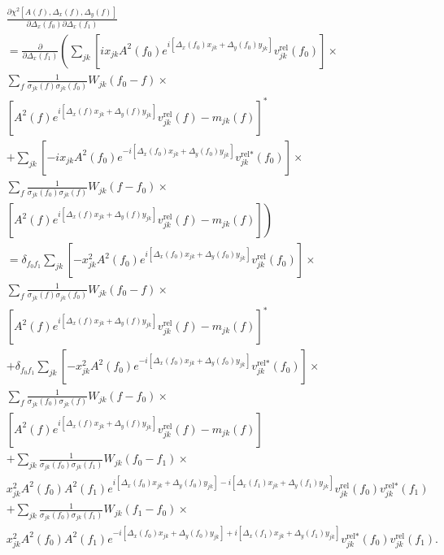 \documentclass{article}
\begin{document}
\begin{equation}
\begin{split}
    &\frac{\partial \chi^2[A(f), \Delta_x(f), \Delta_y(f)]}{\partial \Delta_x(f_0) \partial \Delta_x(f_1)} \\
    & = \frac{\partial}{\partial \Delta_x(f_1)} \left( \sum_{jk} \left[ i x_{jk} A^2(f_0) e^{i[\Delta_x(f_0) x_{jk} + \Delta_y(f_0) y_{jk}]} v^\text{rel}_{jk}(f_0) \right] \times \right. \\
     &\sum_{f}  \frac{1}{\sigma_{jk}(f)\sigma_{jk}(f_0)} W_{jk}(f_0-f) \times \\
    & \left[ A^2(f) e^{i[\Delta_x(f) x_{jk} + \Delta_y(f) y_{jk}]} v^\text{rel}_{jk}(f) - m_{jk}(f) \right]^* \\
    & + \sum_{jk} \left[ -i x_{jk} A^2(f_0) e^{-i[\Delta_x(f_0) x_{jk} + \Delta_y(f_0) y_{jk}]} v^{\text{rel}*}_{jk}(f_0) \right] \times \\
    & \sum_{f}  \frac{1}{\sigma_{jk}(f_0)\sigma_{jk}(f)} W_{jk}(f-f_0) \times \\
    & \left. \left[ A^2(f) e^{i[\Delta_x(f) x_{jk} + \Delta_y(f) y_{jk}]} v^\text{rel}_{jk}(f) - m_{jk}(f) \right] \right) \\
    & = \delta_{f_0 f_1} \sum_{jk} \left[ - x^2_{jk} A^2(f_0) e^{i[\Delta_x(f_0) x_{jk} + \Delta_y(f_0) y_{jk}]} v^\text{rel}_{jk}(f_0) \right] \times \\
     &\sum_{f}  \frac{1}{\sigma_{jk}(f)\sigma_{jk}(f_0)} W_{jk}(f_0-f) \times \\
    & \left[ A^2(f) e^{i[\Delta_x(f) x_{jk} + \Delta_y(f) y_{jk}]} v^\text{rel}_{jk}(f) - m_{jk}(f) \right]^* \\
    & + \delta_{f_0 f_1} \sum_{jk} \left[ - x^2_{jk} A^2(f_0) e^{-i[\Delta_x(f_0) x_{jk} + \Delta_y(f_0) y_{jk}]} v^{\text{rel}*}_{jk}(f_0) \right] \times \\
    & \sum_{f}  \frac{1}{\sigma_{jk}(f_0)\sigma_{jk}(f)} W_{jk}(f-f_0) \times \\
    & \left[ A^2(f) e^{i[\Delta_x(f) x_{jk} + \Delta_y(f) y_{jk}]} v^\text{rel}_{jk}(f) - m_{jk}(f) \right] \\
    & + \sum_{jk} \frac{1}{\sigma_{jk}(f_0)\sigma_{jk}(f_1)} W_{jk}(f_0-f_1) \times \\
    & x^2_{jk} A^2(f_0) A^2(f_1) e^{i[\Delta_x(f_0) x_{jk} + \Delta_y(f_0) y_{jk}]-i[\Delta_x(f_1) x_{jk} + \Delta_y(f_1) y_{jk}]} v^\text{rel}_{jk}(f_0) v^{\text{rel}*}_{jk}(f_1) \\
    & + \sum_{jk} \frac{1}{\sigma_{jk}(f_0)\sigma_{jk}(f_1)} W_{jk}(f_1-f_0) \times \\
    & x^2_{jk} A^2(f_0) A^2(f_1) e^{-i[\Delta_x(f_0) x_{jk} + \Delta_y(f_0) y_{jk}]+i[\Delta_x(f_1) x_{jk} + \Delta_y(f_1) y_{jk}]} v^{\text{rel}*}_{jk}(f_0) v^\text{rel}_{jk}(f_1).
\end{split}
\end{equation}
\end{document}
